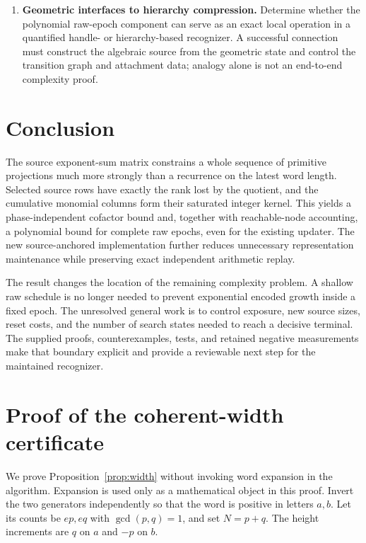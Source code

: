 \documentclass[11pt,letterpaper]{article}
\theoremstyle{definition}
\theoremstyle{remark}\newtheorem{remark}[theorem]{Remark}
\begin{document}
\begin{enumerate}[label=\textbf{Q\arabic*.},leftmargin=2.6em]
\item \textbf{Geometric interfaces to hierarchy compression.}
Determine whether the polynomial raw-epoch component can serve as an exact
local operation in a quantified handle- or hierarchy-based recognizer. A
successful connection must construct the algebraic source from the geometric
state and control the transition graph and attachment data; analogy alone is
not an end-to-end complexity proof.
\end{enumerate}

\section{Conclusion}

The source exponent-sum matrix constrains a whole sequence of primitive
projections much more strongly than a recurrence on the latest word length.
Selected source rows have exactly the rank lost by the quotient, and the
cumulative monomial columns form their saturated integer kernel. This yields
a phase-independent cofactor bound and, together with reachable-node
accounting, a polynomial bound for complete raw epochs, even for the existing
updater. The new source-anchored implementation further reduces unnecessary
representation maintenance while preserving exact independent arithmetic replay.

The result changes the location of the remaining complexity problem. A shallow
raw schedule is no longer needed to prevent exponential encoded growth inside
a fixed epoch. The unresolved general work is to control exposure, new source
sizes, reset costs, and the number of search states needed to reach a decisive
terminal. The supplied proofs, counterexamples, tests, and retained negative
measurements make that boundary explicit and provide a reviewable next step
for the maintained recognizer.

\appendix
\section{Proof of the coherent-width certificate}
\label{app:width}

We prove Proposition~\ref{prop:width} without invoking word expansion in the
algorithm. Expansion is used only as a mathematical object in this proof.
Invert the two generators independently so that the word is positive in
letters $a,b$. Let its counts be $ep,eq$ with $\gcd(p,q)=1$, and set
$N=p+q$. The height increments are $q$ on $a$ and $-p$ on $b$.
\end{document}
